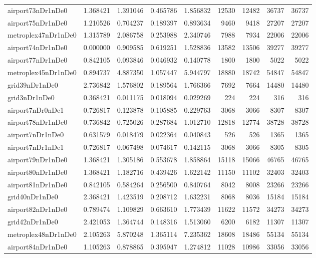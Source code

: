 \begin{longtable}{|l|r|r|r|r|r|r|r|r|}
airport73nDr1nDe0 & 1.368421 & 1.391046 & 0.465786 & 1.856832 & 12530 & 12482 & 36737 & 36737 \\
airport75nDr1nDe0 & 1.210526 & 0.704237 & 0.189397 & 0.893634 & 9460 & 9418 & 27207 & 27207 \\
metroplex47nDr1nDe0 & 1.315789 & 2.086758 & 0.253988 & 2.340746 & 7988 & 7934 & 22006 & 22006 \\
airport74nDr1nDe0 & 0.000000 & 0.909585 & 0.619251 & 1.528836 & 13582 & 13506 & 39277 & 39277 \\
airport77nDr1nDe0 & 0.842105 & 0.093846 & 0.046932 & 0.140778 & 1800 & 1800 & 5022 & 5022 \\
metroplex45nDr1nDe0 & 0.894737 & 4.887350 & 1.057447 & 5.944797 & 18880 & 18742 & 54847 & 54847 \\
grid39nDr1nDe0 & 2.736842 & 1.576802 & 0.189564 & 1.766366 & 7692 & 7664 & 14480 & 14480 \\
grid3nDr1nDe0 & 0.368421 & 0.011175 & 0.018094 & 0.029269 & 224 & 224 & 316 & 316 \\
airport7nDr0nDe1 & 0.726817 & 0.123878 & 0.105885 & 0.229763 & 3068 & 3066 & 8307 & 8307 \\
airport78nDr1nDe0 & 0.736842 & 0.725026 & 0.287684 & 1.012710 & 12818 & 12774 & 38728 & 38728 \\
airport7nDr1nDe0 & 0.631579 & 0.018479 & 0.022364 & 0.040843 & 526 & 526 & 1365 & 1365 \\
airport7nDr1nDe1 & 0.726817 & 0.067498 & 0.074617 & 0.142115 & 3068 & 3066 & 8305 & 8305 \\
airport79nDr1nDe0 & 1.368421 & 1.305186 & 0.553678 & 1.858864 & 15118 & 15066 & 46765 & 46765 \\
airport80nDr1nDe0 & 1.368421 & 1.182716 & 0.439426 & 1.622142 & 11150 & 11102 & 32403 & 32403 \\
airport81nDr1nDe0 & 0.842105 & 0.584264 & 0.256500 & 0.840764 & 8042 & 8008 & 23266 & 23266 \\
grid40nDr1nDe0 & 2.368421 & 1.423519 & 0.208712 & 1.632231 & 8068 & 8036 & 15184 & 15184 \\
airport82nDr1nDe0 & 0.789474 & 1.109829 & 0.663610 & 1.773439 & 11622 & 11572 & 34273 & 34273 \\
grid42nDr1nDe0 & 2.421053 & 1.364744 & 0.148316 & 1.513060 & 6200 & 6182 & 11307 & 11307 \\
metroplex48nDr1nDe0 & 2.105263 & 5.870248 & 1.365114 & 7.235362 & 18608 & 18486 & 55134 & 55134 \\
airport84nDr1nDe0 & 1.105263 & 0.878865 & 0.395947 & 1.274812 & 11028 & 10986 & 33056 & 33056 \\

\end{longtable}

